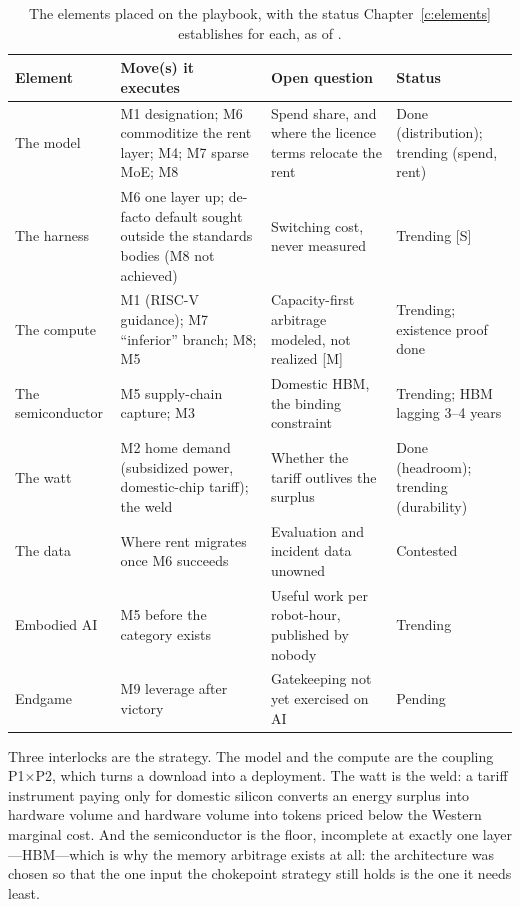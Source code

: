 \begin{table}[htbp]
\centering\footnotesize
\caption{The elements placed on the playbook, with the status Chapter~\ref{c:elements} establishes for each, as of \datafreeze.}
\label{tab:assembled}
\begin{tabular}{@{}p{26mm}p{56mm}p{30mm}p{34mm}@{}}
\toprule
\textbf{Element} & \textbf{Move(s) it executes} & \textbf{Open question} & \textbf{Status} \\
\midrule
The model & M1 designation; M6 commoditize the rent layer; M4; M7 sparse MoE; M8 & Spend share, and where the licence terms relocate the rent & Done (distribution); trending (spend, rent) \\
The harness & M6 one layer up; de-facto default sought outside the standards bodies (M8 not achieved) & Switching cost, never measured & Trending [S] \\
The compute & M1 (RISC-V guidance); M7 ``inferior'' branch; M8; M5 & Capacity-first arbitrage modeled, not realized [M] & Trending; existence proof done \\
The semiconductor & M5 supply-chain capture; M3 & Domestic HBM, the binding constraint & Trending; HBM lagging 3--4 years \\
The watt & M2 home demand (subsidized power, domestic-chip tariff); the weld & Whether the tariff outlives the surplus & Done (headroom); trending (durability) \\
The data & Where rent migrates once M6 succeeds & Evaluation and incident data unowned & Contested \\
Embodied AI & M5 before the category exists & Useful work per robot-hour, published by nobody & Trending \\
Endgame & M9 leverage after victory & Gatekeeping not yet exercised on AI & Pending \\
\bottomrule
\end{tabular}
\end{table}

Three interlocks are the strategy. The model and the compute are the coupling P1$\times$P2, which turns a download into a deployment. The watt is the weld: a tariff instrument paying only for domestic silicon converts an energy surplus into hardware volume and hardware volume into tokens priced below the Western marginal cost. And the semiconductor is the floor, incomplete at exactly one layer---HBM---which is why the memory arbitrage exists at all: the architecture was chosen so that the one input the chokepoint strategy still holds is the one it needs least.


